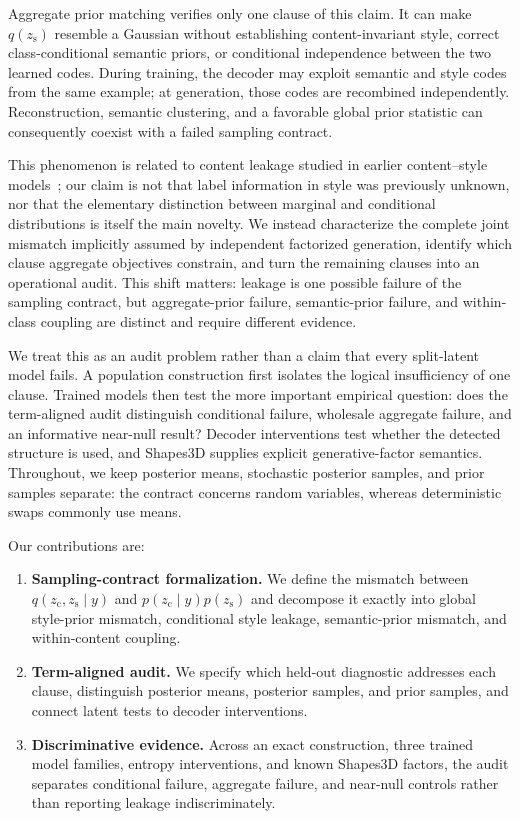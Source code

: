 \documentclass{article}
\newcommand{\zc}{z_{\mathrm{c}}}
\newcommand{\zs}{z_{\mathrm{s}}}
\begin{document}
Aggregate prior matching verifies only one clause of this claim.  It can make
$q(\zs)$ resemble a Gaussian without establishing content-invariant style,
correct class-conditional semantic priors, or conditional independence between
the two learned codes.  During training, the decoder may exploit semantic and
style codes from the same example; at generation, those codes are recombined
independently.  Reconstruction, semantic clustering, and a favorable global
prior statistic can consequently coexist with a failed sampling contract.

This phenomenon is related to content leakage studied in earlier
content--style models~\citep{ridgeway2018leakage}; our claim is not that label
information in style was previously unknown, nor that the elementary
distinction between marginal and conditional distributions is itself the main
novelty.  We instead characterize the complete joint mismatch implicitly
assumed by independent factorized generation, identify which clause aggregate
objectives constrain, and turn the remaining clauses into an operational
audit.  This shift matters: leakage is one possible failure of the sampling
contract, but aggregate-prior failure, semantic-prior failure, and within-class
coupling are distinct and require different evidence.

We treat this as an audit problem rather than a claim that every split-latent
model fails.  A population construction first isolates the logical
insufficiency of one clause.  Trained models then test the more important
empirical question: does the term-aligned audit distinguish conditional
failure, wholesale aggregate failure, and an informative near-null result?
Decoder interventions test whether the detected structure is used, and
Shapes3D supplies explicit generative-factor semantics.  Throughout, we keep
posterior means, stochastic posterior samples, and prior samples separate:
the contract concerns random variables, whereas deterministic swaps commonly
use means.

Our contributions are:
\begin{enumerate}
    \item \textbf{Sampling-contract formalization.}  We define the mismatch
    between $q(\zc,\zs\mid y)$ and $p(\zc\mid y)p(\zs)$ and decompose it
    exactly into global style-prior mismatch, conditional style leakage,
    semantic-prior mismatch, and within-content coupling.
    \item \textbf{Term-aligned audit.}  We specify which held-out diagnostic
    addresses each clause, distinguish posterior means, posterior samples,
    and prior samples, and connect latent tests to decoder interventions.
    \item \textbf{Discriminative evidence.}  Across an exact construction,
    three trained model families, entropy interventions, and known Shapes3D
    factors, the audit separates conditional failure, aggregate failure, and
    near-null controls rather than reporting leakage indiscriminately.
\end{enumerate}
\end{document}
